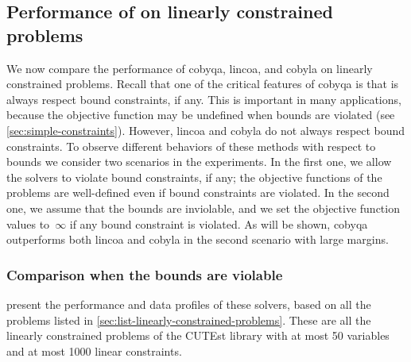 \subsection{Performance of  on linearly constrained problems}
\label{subsec:comparison-cobyqa-lincoa}

We now compare the performance of \gls{cobyqa}, \gls{lincoa}, and \gls{cobyla} on linearly constrained problems.
Recall that one of the critical features of \gls{cobyqa} is that is always respect bound constraints, if any.
This is important in many applications, because the objective function may be undefined when bounds are violated (see \cref{sec:simple-constraints}).
However, \gls{lincoa} and \gls{cobyla} do not always respect bound constraints.
To observe different behaviors of these methods with respect to bounds we consider two scenarios in the experiments.
In the first one, we allow the solvers to violate bound constraints, if any; the objective functions of the problems are well-defined even if bound constraints are violated.
In the second one, we assume that the bounds are inviolable, and we set the objective function values to~$\infty$ if any bound constraint is violated.
As will be shown, \gls{cobyqa} outperforms both \gls{lincoa} and \gls{cobyla} in the second scenario with large margins.

\subsubsection{Comparison when the bounds are violable}

 present the performance and data profiles of these solvers, based on all the problems listed in \cref{sec:list-linearly-constrained-problems}.
These are all the linearly constrained problems of the CUTEst library with at most \num{50} variables and at most \num[group-minimum-digits=4]{1000} linear constraints.

